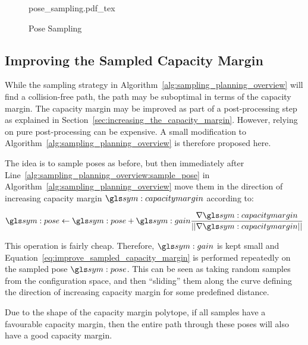 		\begin{figure}[hb]
			\centering
			\def\svgwidth{\columnwidth}
			{pose_sampling.pdf_tex}
			\caption{Pose Sampling}%
			\label{fig:pose_sampling}
		\end{figure}

	\subsection{Improving the Sampled Capacity Margin}%
	\label{sec:improving_the_sampled_capacity_margin}

		While the sampling strategy in
		Algorithm~\ref{alg:sampling_planning_overview} will find a
		collision-free path, the path may be suboptimal in terms of the capacity
		margin. The capacity margin may be improved as part of a post-processing
		step as explained in Section~\ref{sec:increasing_the_capacity_margin}.
		However, relying on pure post-processing can be expensive. A small
		modification to Algorithm~\ref{alg:sampling_planning_overview} is
		therefore proposed here.

		The idea is to sample poses as before, but then immediately after
		Line~\ref{alg:sampling_planning_overview:sample_pose} in
		Algorithm~\ref{alg:sampling_planning_overview} move them in the
		direction of increasing capacity margin $\capacitymargin$ according to:

		\begin{equation}
			\pose \gets \pose +
				\gain\frac
				{%
					\nabla\capacitymargin
				}
				{%
					\norm
					{%
						\nabla\capacitymargin
					}
				}
			\label{eq:improve_sampled_capacity_margin}
		\end{equation}

		This operation is fairly cheap. Therefore, $\gain$ is kept small and
		Equation~\ref{eq:improve_sampled_capacity_margin} is performed
		repeatedly on the sampled pose $\pose$. This can be seen as taking
		random samples from the configuration space, and then ``sliding'' them
		along the curve defining the direction of increasing capacity margin for
		some predefined distance.

		Due to the shape of the capacity margin polytope, if all samples have a
		favourable capacity margin, then the entire path through these poses
		will also have a good capacity margin.

